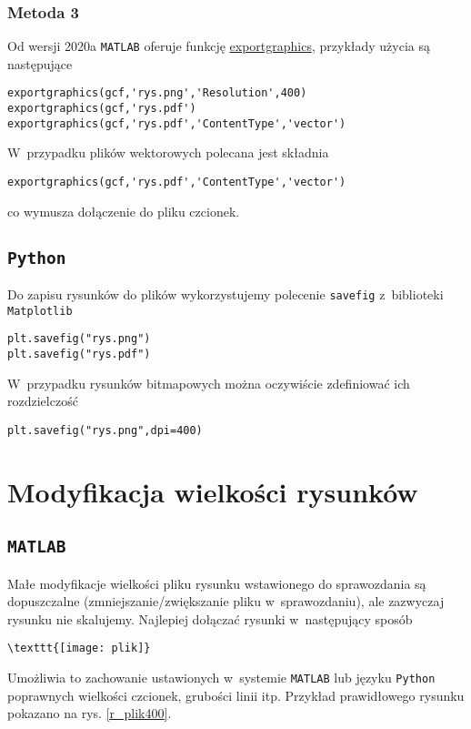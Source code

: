 \subsubsection{Metoda 3}
Od wersji 2020a \texttt{MATLAB} oferuje funkcję \url{exportgraphics}, przykłady użycia są następujące
\begin{lstlisting}[style=custommatlab,frame=single]
exportgraphics(gcf,'rys.png','Resolution',400)
exportgraphics(gcf,'rys.pdf')
exportgraphics(gcf,'rys.pdf','ContentType','vector')
\end{lstlisting}
W~przypadku plików wektorowych polecana jest składnia
\begin{lstlisting}[style=custommatlab,frame=single]
exportgraphics(gcf,'rys.pdf','ContentType','vector')
\end{lstlisting}
co wymusza dołączenie do pliku czcionek.

\subsection{\texttt{Python}}
Do zapisu rysunków do plików wykorzystujemy polecenie \verb|savefig| z~biblioteki \verb|Matplotlib|
\begin{lstlisting}[style=custompython,frame=single]
plt.savefig("rys.png")
plt.savefig("rys.pdf")
\end{lstlisting}
W~przypadku rysunków bitmapowych można oczywiście zdefiniować ich rozdzielczość
\begin{lstlisting}[style=custompython,frame=single]
plt.savefig("rys.png",dpi=400)
\end{lstlisting}

\section{Modyfikacja wielkości rysunków}
\subsection{\texttt{MATLAB}}
Małe modyfikacje wielkości pliku rysunku wstawionego do sprawozdania są dopuszczalne (zmniejszanie/zwiększanie pliku w~sprawozdaniu), ale zazwyczaj rysunku nie skalujemy. Najlepiej dołączać rysunki w~następujący sposób
\begin{lstlisting}[style=customlatex,frame=single]
\texttt{[image: plik]}
\end{lstlisting}
Umożliwia to zachowanie ustawionych w~systemie \texttt{MATLAB} lub języku \texttt{Python} poprawnych wielkości czcionek, grubości linii itp. Przykład prawidłowego rysunku pokazano na rys. \ref{r_plik400}.

